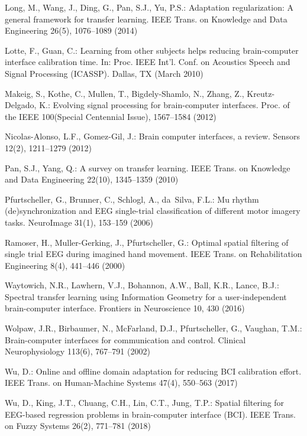 \documentclass[runningheads]{llncs}
\begin{document}
\begin{thebibliography}{10}
Long, M., Wang, J., Ding, G., Pan, S.J., Yu, P.S.: Adaptation regularization: A
  general framework for transfer learning. {IEEE} Trans. on Knowledge and Data
  Engineering  26(5),  1076--1089 (2014)

Lotte, F., Guan, C.: Learning from other subjects helps reducing brain-computer
  interface calibration time. In: Proc. {IEEE} Int'l. Conf. on Acoustics Speech
  and Signal Processing ({ICASSP}). Dallas, TX (March 2010)

Makeig, S., Kothe, C., Mullen, T., Bigdely-Shamlo, N., Zhang, Z.,
  Kreutz-Delgado, K.: Evolving signal processing for brain-computer interfaces.
  Proc. of the {IEEE}  100(Special Centennial Issue),  1567--1584 (2012)

Nicolas-Alonso, L.F., Gomez-Gil, J.: Brain computer interfaces, a review.
  Sensors  12(2),  1211--1279 (2012)

Pan, S.J., Yang, Q.: A survey on transfer learning. {IEEE} Trans. on Knowledge
  and Data Engineering  22(10),  1345--1359 (2010)

Pfurtscheller, G., Brunner, C., Schlogl, A., da~Silva, F.L.: Mu rhythm
  (de)synchronization and {EEG} single-trial classification of different motor
  imagery tasks. NeuroImage  31(1),  153--159 (2006)

Ramoser, H., Muller-Gerking, J., Pfurtscheller, G.: Optimal spatial filtering
  of single trial {EEG} during imagined hand movement. {IEEE} Trans. on
  Rehabilitation Engineering  8(4),  441--446 (2000)

Waytowich, N.R., Lawhern, V.J., Bohannon, A.W., Ball, K.R., Lance, B.J.:
  Spectral transfer learning using {I}nformation {G}eometry for a
  user-independent brain-computer interface. Frontiers in Neuroscience  10,
  430 (2016)

Wolpaw, J.R., Birbaumer, N., McFarland, D.J., Pfurtscheller, G., Vaughan, T.M.:
  Brain-computer interfaces for communication and control. Clinical
  Neurophysiology  113(6),  767--791 (2002)

Wu, D.: Online and offline domain adaptation for reducing {BCI} calibration
  effort. {IEEE} Trans. on Human-Machine Systems  47(4),  550--563 (2017)

Wu, D., King, J.T., Chuang, C.H., Lin, C.T., Jung, T.P.: Spatial filtering for
  {EEG}-based regression problems in brain-computer interface ({BCI}). {IEEE}
  Trans. on Fuzzy Systems  26(2),  771--781 (2018)


\end{thebibliography}
\end{document}
